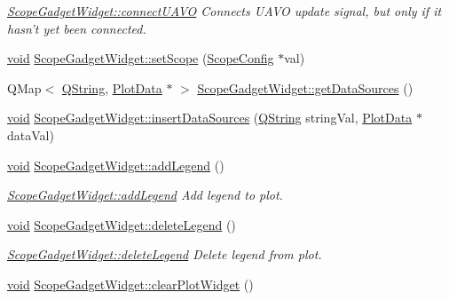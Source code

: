 \begin{DoxyCompactItemize}
\begin{DoxyCompactList}\small\item\em \hyperlink{group__scopeplugin_gae48ddd25c6bea599893a60ab02c375bf}{Scope\-Gadget\-Widget\-::connect\-U\-A\-V\-O} Connects U\-A\-V\-O update signal, but only if it hasn't yet been connected. \end{DoxyCompactList}\item 
\hyperlink{group___u_a_v_objects_plugin_ga444cf2ff3f0ecbe028adce838d373f5c}{void} \hyperlink{group__scopeplugin_gaf7086ffcc7a7a1bbcaac30108908ea19}{Scope\-Gadget\-Widget\-::set\-Scope} (\hyperlink{class_scope_config}{Scope\-Config} $\ast$val)
\item 
Q\-Map$<$ \hyperlink{group___u_a_v_objects_plugin_gab9d252f49c333c94a72f97ce3105a32d}{Q\-String}, \hyperlink{class_plot_data}{Plot\-Data} $\ast$ $>$ \hyperlink{group__scopeplugin_gae23ab8c7b7852bc2ac59639923fb8cfc}{Scope\-Gadget\-Widget\-::get\-Data\-Sources} ()
\item 
\hyperlink{group___u_a_v_objects_plugin_ga444cf2ff3f0ecbe028adce838d373f5c}{void} \hyperlink{group__scopeplugin_ga4682e74303bf7b117006e3d61a6827ce}{Scope\-Gadget\-Widget\-::insert\-Data\-Sources} (\hyperlink{group___u_a_v_objects_plugin_gab9d252f49c333c94a72f97ce3105a32d}{Q\-String} string\-Val, \hyperlink{class_plot_data}{Plot\-Data} $\ast$data\-Val)
\item 
\hyperlink{group___u_a_v_objects_plugin_ga444cf2ff3f0ecbe028adce838d373f5c}{void} \hyperlink{group__scopeplugin_ga3f88f383dc322a2516c1e6b874e341a0}{Scope\-Gadget\-Widget\-::add\-Legend} ()
\begin{DoxyCompactList}\small\item\em \hyperlink{group__scopeplugin_ga3f88f383dc322a2516c1e6b874e341a0}{Scope\-Gadget\-Widget\-::add\-Legend} Add legend to plot. \end{DoxyCompactList}\item 
\hyperlink{group___u_a_v_objects_plugin_ga444cf2ff3f0ecbe028adce838d373f5c}{void} \hyperlink{group__scopeplugin_ga16702effa3e6ad5ddf0f94a77e9c430a}{Scope\-Gadget\-Widget\-::delete\-Legend} ()
\begin{DoxyCompactList}\small\item\em \hyperlink{group__scopeplugin_ga16702effa3e6ad5ddf0f94a77e9c430a}{Scope\-Gadget\-Widget\-::delete\-Legend} Delete legend from plot. \end{DoxyCompactList}\item 
\hyperlink{group___u_a_v_objects_plugin_ga444cf2ff3f0ecbe028adce838d373f5c}{void} \hyperlink{group__scopeplugin_ga9a19de9754adbab7df27b7db75348346}{Scope\-Gadget\-Widget\-::clear\-Plot\-Widget} ()

\end{DoxyCompactItemize}
